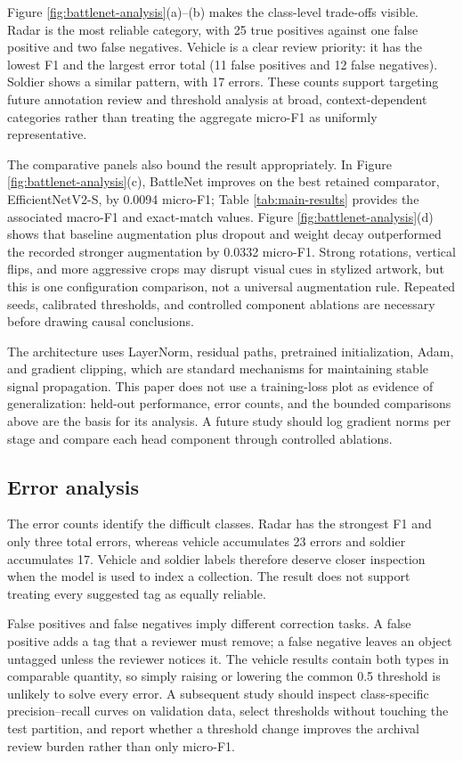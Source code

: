 \documentclass[conference]{IEEEtran}
\begin{document}
Figure \ref{fig:battlenet-analysis}(a)--(b) makes the class-level trade-offs visible. Radar is the most reliable category, with 25 true positives against one false positive and two false negatives. Vehicle is a clear review priority: it has the lowest F1 and the largest error total (11 false positives and 12 false negatives). Soldier shows a similar pattern, with 17 errors. These counts support targeting future annotation review and threshold analysis at broad, context-dependent categories rather than treating the aggregate micro-F1 as uniformly representative.

The comparative panels also bound the result appropriately. In Figure \ref{fig:battlenet-analysis}(c), BattleNet improves on the best retained comparator, EfficientNetV2-S, by 0.0094 micro-F1; Table \ref{tab:main-results} provides the associated macro-F1 and exact-match values. Figure \ref{fig:battlenet-analysis}(d) shows that baseline augmentation plus dropout and weight decay outperformed the recorded stronger augmentation by 0.0332 micro-F1. Strong rotations, vertical flips, and more aggressive crops may disrupt visual cues in stylized artwork, but this is one configuration comparison, not a universal augmentation rule. Repeated seeds, calibrated thresholds, and controlled component ablations are necessary before drawing causal conclusions.

The architecture uses LayerNorm, residual paths, pretrained initialization, Adam, and gradient clipping, which are standard mechanisms for maintaining stable signal propagation. This paper does not use a training-loss plot as evidence of generalization: held-out performance, error counts, and the bounded comparisons above are the basis for its analysis. A future study should log gradient norms per stage and compare each head component through controlled ablations.

\subsection{Error analysis}
The error counts identify the difficult classes. Radar has the strongest F1 and only three total errors, whereas vehicle accumulates 23 errors and soldier accumulates 17. Vehicle and soldier labels therefore deserve closer inspection when the model is used to index a collection. The result does not support treating every suggested tag as equally reliable.

False positives and false negatives imply different correction tasks. A false positive adds a tag that a reviewer must remove; a false negative leaves an object untagged unless the reviewer notices it. The vehicle results contain both types in comparable quantity, so simply raising or lowering the common 0.5 threshold is unlikely to solve every error. A subsequent study should inspect class-specific precision--recall curves on validation data, select thresholds without touching the test partition, and report whether a threshold change improves the archival review burden rather than only micro-F1.
\end{document}
